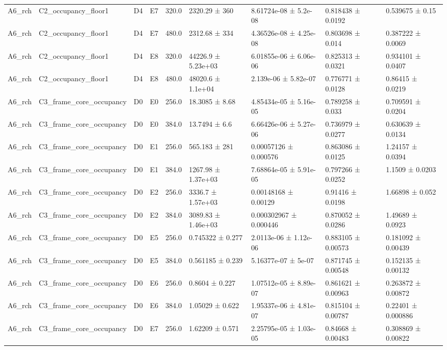 \begin{table}
\begin{tabular}{lllllllll}
A6\_rch & C2\_occupancy\_floor1 & D4 & E7 & 320.0 & 2320.29 ± 360 & 8.61724e-08 ± 5.2e-08 & 0.818438 ± 0.0192 & 0.539675 ± 0.15 \\
A6\_rch & C2\_occupancy\_floor1 & D4 & E7 & 480.0 & 2312.68 ± 334 & 4.36526e-08 ± 4.25e-08 & 0.803698 ± 0.014 & 0.387222 ± 0.0069 \\
A6\_rch & C2\_occupancy\_floor1 & D4 & E8 & 320.0 & 44226.9 ± 5.23e+03 & 6.01855e-06 ± 6.06e-06 & 0.825313 ± 0.0321 & 0.934101 ± 0.0407 \\
A6\_rch & C2\_occupancy\_floor1 & D4 & E8 & 480.0 & 48020.6 ± 1.1e+04 & 2.139e-06 ± 5.82e-07 & 0.776771 ± 0.0128 & 0.86415 ± 0.0219 \\
A6\_rch & C3\_frame\_core\_occupancy & D0 & E0 & 256.0 & 18.3085 ± 8.68 & 4.85434e-05 ± 5.16e-05 & 0.789258 ± 0.033 & 0.709591 ± 0.0204 \\
A6\_rch & C3\_frame\_core\_occupancy & D0 & E0 & 384.0 & 13.7494 ± 6.6 & 6.66426e-06 ± 5.27e-06 & 0.736979 ± 0.0277 & 0.630639 ± 0.0134 \\
A6\_rch & C3\_frame\_core\_occupancy & D0 & E1 & 256.0 & 565.183 ± 281 & 0.00057126 ± 0.000576 & 0.863086 ± 0.0125 & 1.24157 ± 0.0394 \\
A6\_rch & C3\_frame\_core\_occupancy & D0 & E1 & 384.0 & 1267.98 ± 1.37e+03 & 7.68864e-05 ± 5.91e-05 & 0.797266 ± 0.0252 & 1.1509 ± 0.0203 \\
A6\_rch & C3\_frame\_core\_occupancy & D0 & E2 & 256.0 & 3336.7 ± 1.57e+03 & 0.00148168 ± 0.00129 & 0.91416 ± 0.0198 & 1.66898 ± 0.052 \\
A6\_rch & C3\_frame\_core\_occupancy & D0 & E2 & 384.0 & 3089.83 ± 1.46e+03 & 0.000302967 ± 0.000446 & 0.870052 ± 0.0286 & 1.49689 ± 0.0923 \\
A6\_rch & C3\_frame\_core\_occupancy & D0 & E5 & 256.0 & 0.745322 ± 0.277 & 2.0113e-06 ± 1.12e-06 & 0.883105 ± 0.00573 & 0.181092 ± 0.00439 \\
A6\_rch & C3\_frame\_core\_occupancy & D0 & E5 & 384.0 & 0.561185 ± 0.239 & 5.16377e-07 ± 5e-07 & 0.871745 ± 0.00548 & 0.152135 ± 0.00132 \\
A6\_rch & C3\_frame\_core\_occupancy & D0 & E6 & 256.0 & 0.8604 ± 0.227 & 1.07512e-05 ± 8.89e-07 & 0.861621 ± 0.00963 & 0.263872 ± 0.00872 \\
A6\_rch & C3\_frame\_core\_occupancy & D0 & E6 & 384.0 & 1.05029 ± 0.622 & 1.95337e-06 ± 4.81e-07 & 0.815104 ± 0.00787 & 0.22401 ± 0.000886 \\
A6\_rch & C3\_frame\_core\_occupancy & D0 & E7 & 256.0 & 1.62209 ± 0.571 & 2.25795e-05 ± 1.03e-05 & 0.84668 ± 0.00483 & 0.308869 ± 0.00822 \\

\end{tabular}
\end{table}
